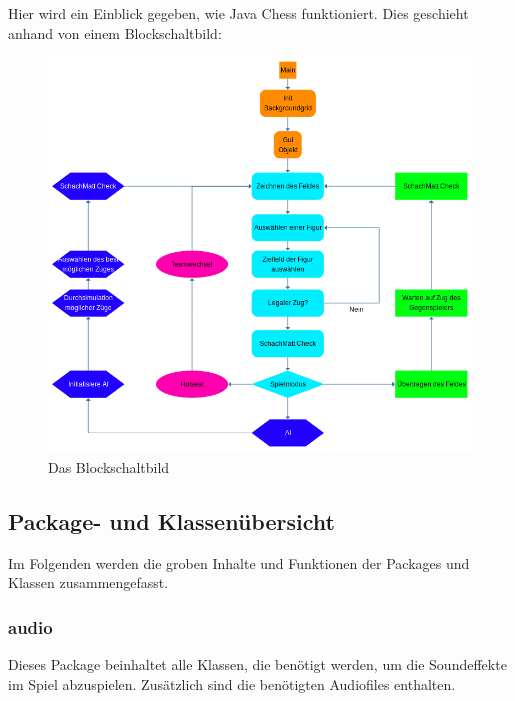 \documentclass[12pt,a4paper]{article}
\begin{document}
Hier wird ein Einblick gegeben, wie Java Chess funktioniert. Dies geschieht anhand von einem Blockschaltbild: \\
\vspace{1cm}


\begin{figure}[H]
  \centering
   	\includegraphics[width=14cm]{graphics/block.png}
  \caption{Das Blockschaltbild}
  \label{fig:block}
\end{figure}

\newpage
\subsection{Package- und Klassenübersicht}
\label{SUBSEC:PACKAGE}

Im Folgenden werden die groben Inhalte und Funktionen der Packages und Klassen zusammengefasst.\

\subsubsection{audio}

Dieses Package beinhaltet alle Klassen, die benötigt werden, um die Soundeffekte im Spiel abzuspielen. Zusätzlich sind die benötigten Audiofiles enthalten.\
\end{document}
